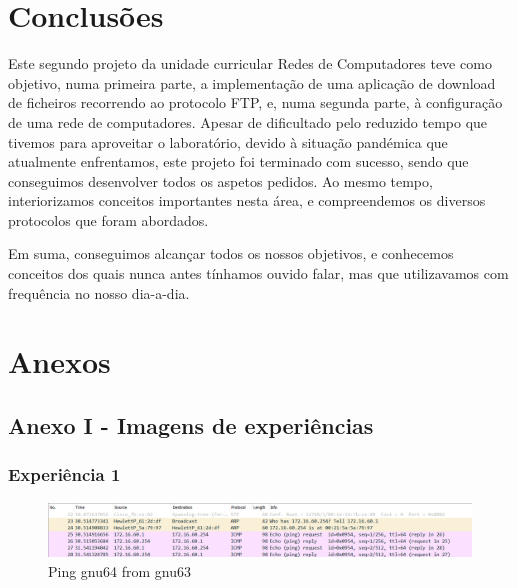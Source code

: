 \documentclass[article, a4paper, 11pt, oneside]{memoir}
\begin{document}
\chapter[Conclusões][Conclusões]{Conclusões} \label{\thechapter}

Este segundo projeto da unidade curricular Redes de Computadores teve como objetivo, numa primeira parte, a implementação de uma aplicação de download de ficheiros recorrendo ao protocolo FTP,
e, numa segunda parte, à configuração de uma rede de computadores. Apesar de dificultado pelo reduzido tempo que tivemos para aproveitar o laboratório, devido à situação pandémica que atualmente enfrentamos,
este projeto foi terminado com sucesso, sendo que conseguimos desenvolver todos os aspetos pedidos.
Ao mesmo tempo, interiorizamos conceitos importantes nesta área, e compreendemos os diversos protocolos que foram abordados.

Em suma, conseguimos alcançar todos os nossos objetivos, e conhecemos conceitos dos quais nunca antes tínhamos ouvido falar, mas que utilizavamos com frequência no nosso dia-a-dia.

\newpage
\chapter[Anexos][Anexos]{Anexos} \label{\thechapter}

\section{Anexo I - Imagens de experiências}
\subsection{Experiência 1}

\begin{figure}[h]
	\centering
\includegraphics[scale=0.45]{exp1-gnu63.png}
\caption{Ping gnu64 from gnu63}
\end{figure}
\end{document}
